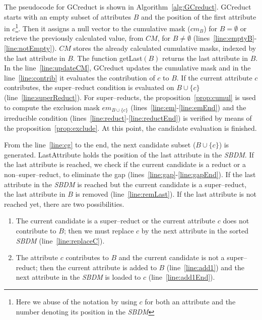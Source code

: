 \documentclass[authoryear,preprint,review,12pt]{elsarticle}
\begin{document}
		The pseudocode for GCreduct is shown in Algorithm~\ref{alg:GCreduct}. GCreduct starts with an empty subset of attributes $B$ and the position of the first attribute in $c$\footnote{Here we abuse of the notation by using $c$ for both an attribute and the number denoting its position in the \textit{SBDM}}. Then it assigns a null vector to the cumulative mask ($cm_B$) for $B=\emptyset$ or retrieve the previously calculated value, from $CM$, for $B\neq \emptyset$ (lines~\ref{line:emptyB}-\ref{line:notEmpty}). $CM$ stores the already calculated cumulative masks, indexed by the last attribute in $B$. The function getLast$(B)$ returns the last attribute in $B$. In the line~\ref{line:updateCM}, GCreduct updates the cumulative mask and in		the line~\ref{line:contrib} it evaluates the contribution of $c$ to $B$. If the current attribute $c$ contributes, the super--reduct condition is evaluated on $B\cup \lbrace c\rbrace$ (line~\ref{line:superReduct}). For super--reducts, the proposition~\ref{prop:cumul} is used to compute the exclusion mask $em_{B\cup \lbrace c\rbrace}$ (lines~\ref{line:em}-\ref{line:emEnd}) and the irreducible condition (lines~\ref{line:reduct}-\ref{line:reductEnd}) is verified by means of the proposition~\ref{prop:exclude}. At this point, the candidate evaluation is finished.
		
		From the line~\ref{line:cg} to the end, the next candidate subset ($B\cup \lbrace c\rbrace$) is generated. 
		LastAttribute holds the position of the last attribute in the \textit{SBDM}. If the last attribute is
		reached, we check if the current candidate is a reduct or a non--super--reduct, to eliminate the gap
		(lines~\ref{line:gap}-\ref{line:gapEnd}). If the last attribute in the \textit{SBDM} is reached but the current candidate is a super--reduct, the last attribute in $B$ is removed (line~\ref{line:remLast}). If the last attribute is 
		not reached yet, there are two possibilities. 
		\begin{enumerate}
			\item The current candidate is a super--reduct or the current attribute $c$ does not contribute to $B$; then we must replace $c$ by the next attribute in the sorted \textit{SBDM} (line~\ref{line:replaceC}).
			\item The attribute $c$ contributes to $B$ and the current candidate is not a super--reduct; then the current attribute is added to $B$ (line~\ref{line:add1}) and the next attribute in the \textit{SBDM} is loaded to $c$ (line~\ref{line:add1End}).
		\end{enumerate}  
	
\end{document}
